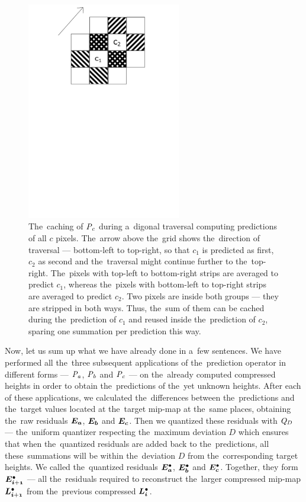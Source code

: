 \begin{figure}
	\includegraphics[trim={0 18cm 1cm 0cm}, clip, width=0.6\textwidth]{figures/ccaching.pdf}\centering
	\caption{The~caching of $\mathit{P_{c}}$ during a~digonal traversal computing predictions of all $c$ pixels. The~arrow above the~grid shows the~direction of traversal --- bottom-left to top-right, so that $c_1$ is predicted as first, $c_2$ as second and the~traversal might continue further to the~top-right. The~pixels with top-left to bottom-right strips are averaged to predict $c_1$, whereas the~pixels with bottom-left to top-right strips are averaged to predict $c_2$. Two pixels are inside both groups --- they are stripped in both ways. Thus, the~sum of them can be cached during the~prediction of $c_1$ and reused inside the~prediction of $c_2$, sparing one summation per prediction this way.}
	\label{fig:ccaching}
\end{figure}

Now, let us sum up what we have already done in a~few sentences. We have performed all the~three subsequent applications of the~prediction operator in different forms --- $\mathit{P_{a}}$, $\mathit{P_{b}}$ and $\mathit{P_{c}}$ --- on the~already computed compressed heights in order to obtain the~predictions of the~yet unknown heights. After each of these applications, we calculated the~differences between the~predictions and the~target values located at the~target mip-map at the~same places, obtaining the~raw residuals $\objnorm{E}{a}$, $\objnorm{E}{b}$ and $\objnorm{E}{c}$. Then we quantized these residuals with $\mathit{Q_{D}}$ --- the~uniform quantizer respecting the~maximum deviation $D$ which ensures that when the~quantized residuals are added back to the~predictions, all these~summations will be within the~deviation $D$ from the~corresponding target heights. We called the~quantized residuals $\objdot{E}{a}$, $\objdot{E}{b}$ and $\objdot{E}{c}$. Together, they form $\objdot{E}{i+1}$ --- all the~residuals required to reconstruct the~larger compressed mip-map $\ldot{i+1}$ from the~previous compressed $\ldot{i}$.

